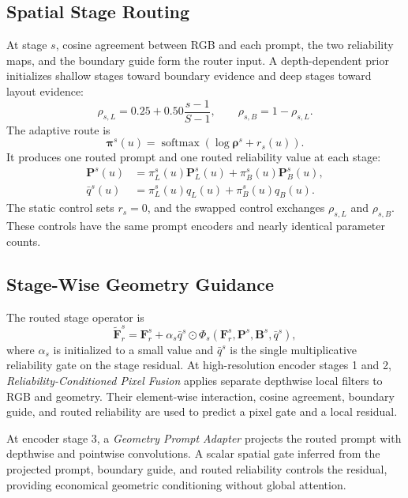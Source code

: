 \documentclass[a4paper,fleqn]{cas-dc}
\begin{document}
\subsection{Spatial Stage Routing}

At stage $s$, cosine agreement between RGB and each prompt, the two reliability maps, and the boundary guide form the router input. A depth-dependent prior initializes shallow stages toward boundary evidence and deep stages toward layout evidence:
\begin{equation}
  \rho_{s,L}=0.25+0.50\frac{s-1}{S-1},\qquad
  \rho_{s,B}=1-\rho_{s,L}.
\end{equation}
The adaptive route is
\begin{equation}
  \boldsymbol{\pi}^{s}(u)=\operatorname{softmax}
  \left(\log\boldsymbol{\rho}^{s}+r_s(u)\right).
\end{equation}
It produces one routed prompt and one routed reliability value at each stage:
\begin{align}
  \mathbf{P}^{s}(u)&=\pi_{L}^{s}(u)\mathbf{P}_{L}^{s}(u)+
  \pi_{B}^{s}(u)\mathbf{P}_{B}^{s}(u),\\
  \bar q^{s}(u)&=\pi_{L}^{s}(u)q_L(u)+\pi_{B}^{s}(u)q_B(u).
\end{align}
The static control sets $r_s=0$, and the swapped control exchanges $\rho_{s,L}$ and $\rho_{s,B}$. These controls have the same prompt encoders and nearly identical parameter counts.

\subsection{Stage-Wise Geometry Guidance}

The routed stage operator is
\begin{equation}
  \widetilde{\mathbf{F}}_{r}^{s}=\mathbf{F}_{r}^{s}+
  \alpha_s\bar q^{s}\odot
  \Phi_s(\mathbf{F}_{r}^{s},\mathbf{P}^{s},\mathbf{B}^{s},\bar q^{s}),
\end{equation}
where $\alpha_s$ is initialized to a small value and $\bar q^s$ is the single multiplicative reliability gate on the stage residual. At high-resolution encoder stages 1 and 2, \emph{Reliability-Conditioned Pixel Fusion} applies separate depthwise local filters to RGB and geometry. Their element-wise interaction, cosine agreement, boundary guide, and routed reliability are used to predict a pixel gate and a local residual.

At encoder stage 3, a \emph{Geometry Prompt Adapter} projects the routed prompt with depthwise and pointwise convolutions. A scalar spatial gate inferred from the projected prompt, boundary guide, and routed reliability controls the residual, providing economical geometric conditioning without global attention.
\end{document}
